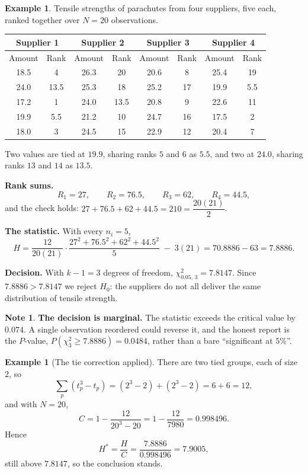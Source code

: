 \documentclass[11pt,a4paper]{article}
\theoremstyle{definition}
\newtheorem{example}[thm]{Example}
\newtheorem{note}[thm]{Note}
\begin{document}
\begin{example}
Tensile strengths of parachutes from four suppliers, five each, ranked together
over $N = 20$ observations.

\begin{center}
\begin{tabular}{|cc|cc|cc|cc|}
\hline
\multicolumn{2}{|c|}{Supplier 1} & \multicolumn{2}{c|}{Supplier 2}
& \multicolumn{2}{c|}{Supplier 3} & \multicolumn{2}{c|}{Supplier 4}\\
\hline
Amount & Rank & Amount & Rank & Amount & Rank & Amount & Rank\\
\hline
18.5 & 4    & 26.3 & 20   & 20.6 & 8  & 25.4 & 19\\
24.0 & 13.5 & 25.3 & 18   & 25.2 & 17 & 19.9 & 5.5\\
17.2 & 1    & 24.0 & 13.5 & 20.8 & 9  & 22.6 & 11\\
19.9 & 5.5  & 21.2 & 10   & 24.7 & 16 & 17.5 & 2\\
18.0 & 3    & 24.5 & 15   & 22.9 & 12 & 20.4 & 7\\
\hline
\end{tabular}
\end{center}

Two values are tied at $19.9$, sharing ranks $5$ and $6$ as $5.5$, and two at
$24.0$, sharing ranks $13$ and $14$ as $13.5$.

\textbf{Rank sums.}
$$R_1 = 27,\qquad R_2 = 76.5,\qquad R_3 = 62,\qquad R_4 = 44.5,$$
and the check holds:
$27 + 76.5 + 62 + 44.5 = 210 = \dfrac{20(21)}{2}$.

\textbf{The statistic.} With every $n_i = 5$,
$$H = \dfrac{12}{20(21)}\cdot\dfrac{27^{2} + 76.5^{2} + 62^{2} + 44.5^{2}}{5}
\;-\; 3(21)
= 70.8886 - 63 = 7.8886 .$$

\textbf{Decision.} With $k - 1 = 3$ degrees of freedom,
$\chi^{2}_{0.05,\,3} = 7.8147$. Since $7.8886 > 7.8147$ we reject $H_0$: the
suppliers do not all deliver the same distribution of tensile strength.
\end{example}

\begin{note}
\textbf{The decision is marginal.} The statistic exceeds the critical value by
$0.074$. A single observation reordered could reverse it, and the honest report is
the $P$-value, $P(\chi^{2}_{3} \geq 7.8886) = 0.0484$, rather than a bare
``significant at $5\%$''.
\end{note}

\begin{example}[The tie correction applied]
There are two tied groups, each of size $2$, so
$$\sum_{p}\left(t_p^{3}-t_p\right) = \left(2^{3}-2\right) + \left(2^{3}-2\right)
= 6 + 6 = 12 ,$$
and with $N = 20$,
$$C = 1 - \dfrac{12}{20^{3}-20} = 1 - \dfrac{12}{7980} = 0.998496 .$$
Hence
$$H^{*} = \dfrac{H}{C} = \dfrac{7.8886}{0.998496} = 7.9005 ,$$
still above $7.8147$, so the conclusion stands.
\end{example}
\end{document}
